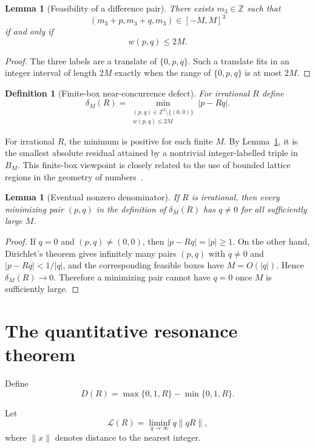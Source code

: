 \documentclass[11pt,a4paper]{article}
\newcommand{\deltam}{\delta_M}
\newtheorem{lemma}[theorem]{Lemma}
\newtheorem{definition}[theorem]{Definition}
\begin{document}
\begin{lemma}[Feasibility of a difference pair]\label{lem:feas}
There exists $m_3\in\mathbb Z$ such that
\[
(m_3+p,m_3+q,m_3)\in[-M,M]^3
\]
if and only if
\[
w(p,q)\le2M.
\]
\end{lemma}

\begin{proof}
The three labels are a translate of $\{0,p,q\}$. Such a translate fits in an integer interval of
length $2M$ exactly when the range of $\{0,p,q\}$ is at most $2M$.
\end{proof}

\begin{definition}[Finite-box near-concurrence defect]\label{def:delta}
For irrational $R$ define
\[
\boxed{
\deltam(R)=
\min_{\substack{(p,q)\in\mathbb Z^2\setminus\{(0,0)\}\\
w(p,q)\le2M}}
|p-Rq|.
}
\]
\end{definition}

For irrational $R$, the minimum is positive for each finite $M$. By Lemma~\ref{lem:feas}, it is the smallest absolute residual attained by a nontrivial integer-labelled triple in $B_M$. This finite-box viewpoint is closely related to the use of bounded lattice regions in the geometry of numbers~\cite{casselsgeometry,gruberlekkerkerker}.

\begin{lemma}[Eventual nonzero denominator]\label{lem:qnonzero}
If $R$ is irrational, then every minimizing pair $(p,q)$ in the definition of $\deltam(R)$ has
$q\ne0$ for all sufficiently large $M$.
\end{lemma}

\begin{proof}
If $q=0$ and $(p,q)\ne(0,0)$, then $|p-Rq|=|p|\ge1$. On the other hand, Dirichlet's theorem
gives infinitely many pairs $(p,q)$ with $q\ne0$ and $|p-Rq|<1/|q|$, and the corresponding
feasible boxes have $M=O(|q|)$. Hence $\deltam(R)\to0$. Therefore a minimizing pair cannot have
$q=0$ once $M$ is sufficiently large.
\end{proof}

\section{The quantitative resonance theorem}
Define
\[
D(R)=\max\{0,1,R\}-\min\{0,1,R\}.
\]

Let
\[
\mathcal L(R)=\liminf_{q\to\infty}q\|qR\|,
\]
where $\|x\|$ denotes distance to the nearest integer.
\end{document}
